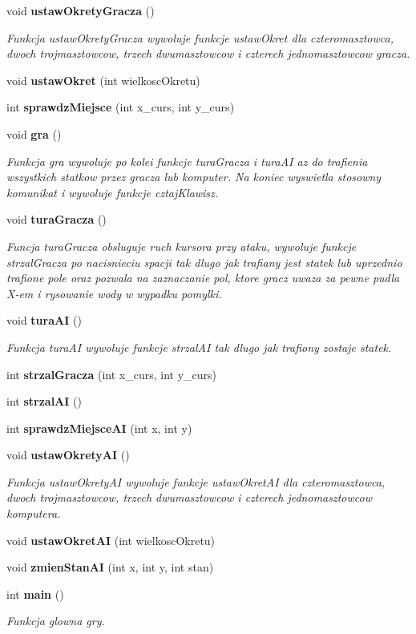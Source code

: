\begin{DoxyCompactItemize}
void \textbf{ ustaw\+Okrety\+Gracza} ()
\begin{DoxyCompactList}\small\item\em Funkcja ustaw\+Okrety\+Gracza wywoluje funkcje ustaw\+Okret dla czteromasztowca, dwoch trojmasztowcow, trzech dwumasztowcow i czterech jednomasztowcow gracza. \end{DoxyCompactList}\item 
void \textbf{ ustaw\+Okret} (int wielkosc\+Okretu)
\item 
int \textbf{ sprawdz\+Miejsce} (int x\+\_\+curs, int y\+\_\+curs)
\item 
void \textbf{ gra} ()
\begin{DoxyCompactList}\small\item\em Funkcja gra wywoluje po kolei funkcje tura\+Gracza i tura\+AI az do trafienia wszystkich statkow przez gracza lub komputer. Na koniec wyswietla stosowny komunikat i wywoluje funkcje cztaj\+Klawisz. \end{DoxyCompactList}\item 
void \textbf{ tura\+Gracza} ()
\begin{DoxyCompactList}\small\item\em Funcja tura\+Gracza obsluguje ruch kursora przy ataku, wywoluje funkcje strzal\+Gracza po nacisnieciu spacji tak dlugo jak trafiany jest statek lub uprzednio trafione pole oraz pozwala na zaznaczanie pol, ktore gracz uwaza za pewne pudla X-\/em i rysowanie wody w wypadku pomylki. \end{DoxyCompactList}\item 
void \textbf{ tura\+AI} ()
\begin{DoxyCompactList}\small\item\em Funkcja tura\+AI wywoluje funkcje strzal\+AI tak dlugo jak trafiony zostaje statek. \end{DoxyCompactList}\item 
int \textbf{ strzal\+Gracza} (int x\+\_\+curs, int y\+\_\+curs)
\item 
int \textbf{ strzal\+AI} ()
\item 
int \textbf{ sprawdz\+Miejsce\+AI} (int x, int y)
\item 
void \textbf{ ustaw\+Okrety\+AI} ()
\begin{DoxyCompactList}\small\item\em Funkcja ustaw\+Okrety\+AI wywoluje funkcje ustaw\+Okret\+AI dla czteromasztowca, dwoch trojmasztowcow, trzech dwumasztowcow i czterech jednomasztowcow komputera. \end{DoxyCompactList}\item 
void \textbf{ ustaw\+Okret\+AI} (int wielkosc\+Okretu)
\item 
void \textbf{ zmien\+Stan\+AI} (int x, int y, int stan)
\item 
int \textbf{ main} ()
\begin{DoxyCompactList}\small\item\em Funkcja glowna gry. \end{DoxyCompactList}\end{DoxyCompactItemize}
